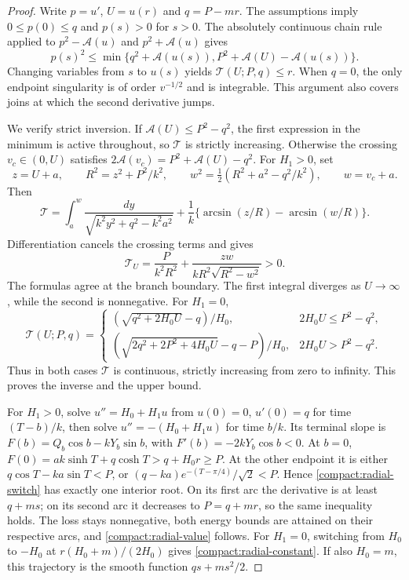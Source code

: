 \begin{proof}
Write $p=u'$, $U=u(r)$ and $q=P-mr$. The assumptions imply
$0\le p(0)\le q$ and $p(s)>0$ for $s>0$. The absolutely continuous
chain rule applied to $p^2-\mathcal A(u)$ and $p^2+\mathcal A(u)$ gives
\begin{equation}\label{energy:two-sided}
 p(s)^2\le
 \min\{q^2+\mathcal A(u(s)),P^2+\mathcal A(U)-\mathcal A(u(s))\}.
\end{equation}
Changing variables from $s$ to $u(s)$ yields
$\mathcal T(U;P,q)\le r$. When $q=0$, the only endpoint singularity
is of order $v^{-1/2}$ and is integrable. This argument also covers
joins at which the second derivative jumps.

We verify strict inversion. If $\mathcal A(U)\le P^2-q^2$, the first
expression in the minimum is active throughout, so $\mathcal T$ is
strictly increasing. Otherwise the crossing $v_c\in(0,U)$ satisfies
$2\mathcal A(v_c)=P^2+\mathcal A(U)-q^2$.
For $H_1>0$, set
\[
 z=U+a,\qquad R^2=z^2+P^2/k^2,\qquad
 w^2=\tfrac12(R^2+a^2-q^2/k^2),\qquad w=v_c+a.
\]
Then
\[
 \mathcal T=
 \int_a^w\frac{dy}{\sqrt{k^2y^2+q^2-k^2a^2}}
 +\frac1k\{\arcsin(z/R)-\arcsin(w/R)\}.
\]
Differentiation cancels the crossing terms and gives
\begin{equation}\label{boundarygap:time-derivative}
 \mathcal T_U=\frac{P}{k^2R^2}
       +\frac{zw}{kR^2\sqrt{R^2-w^2}}>0.
\end{equation}
The formulas agree at the branch boundary. The first integral diverges
as $U\to\infty$, while the second is nonnegative. For $H_1=0$,
\[
 \mathcal T(U;P,q)=
 \begin{cases}
 (\sqrt{q^2+2H_0U}-q)/H_0,&2H_0U\le P^2-q^2,\\[1mm]
 (\sqrt{2q^2+2P^2+4H_0U}-q-P)/H_0,&2H_0U>P^2-q^2.
 \end{cases}
\]
Thus in both cases $\mathcal T$ is continuous, strictly increasing
from zero to infinity. This proves the inverse and the upper bound.

For $H_1>0$, solve $u''=H_0+H_1u$ from $u(0)=0$, $u'(0)=q$ for
time $(T-b)/k$, then solve $u''=-(H_0+H_1u)$ for time $b/k$.
Its terminal slope is $F(b)=Q_b\cos b-kY_b\sin b$, with
$F'(b)=-2kY_b\cos b<0$. At $b=0$,
$F(0)=ak\sinh T+q\cosh T>q+H_0r\ge P$.
At the other endpoint it is either $q\cos T-ka\sin T<P$, or
$(q-ka)e^{-(T-\pi/4)}/\sqrt2<P$.
Hence \eqref{compact:radial-switch} has exactly one interior root.
On its first arc the derivative is at least $q+ms$; on its second
arc it decreases to $P=q+mr$, so the same inequality holds.
The loss stays nonnegative, both energy bounds are attained on their
respective arcs, and \eqref{compact:radial-value} follows.
For $H_1=0$, switching from $H_0$ to $-H_0$ at
$r(H_0+m)/(2H_0)$ gives \eqref{compact:radial-constant}.
If also $H_0=m$, this trajectory is the smooth function $qs+ms^2/2$.


\end{proof}

